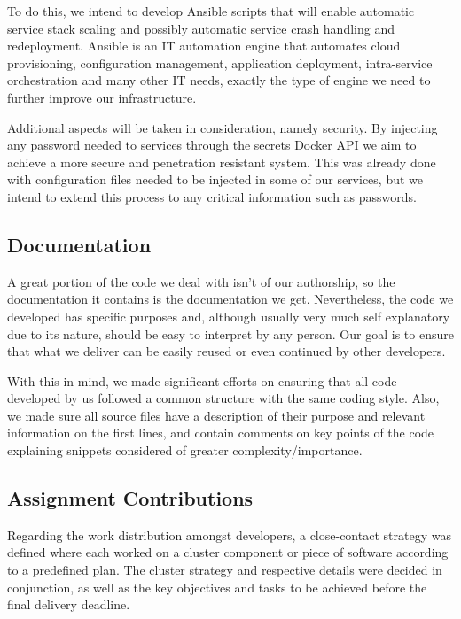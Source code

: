 \documentclass[12pt]{article}
\begin{document}
To do this, we intend to develop Ansible scripts that will enable automatic service stack scaling and possibly automatic service crash handling and redeployment.
Ansible \cite{ansible} is an IT automation engine that automates cloud provisioning, configuration management, application deployment, intra-service orchestration 
and many other IT needs, exactly the type of engine we need to further improve our infrastructure.

Additional aspects will be taken in consideration, namely security. 
By injecting any password needed to services through the secrets Docker API we aim to achieve a more secure and penetration resistant system. 
This was already done with configuration files needed to be injected in some of our services, but we intend to extend this process to any critical information 
such as passwords.

\subsection{Documentation} \label{remarks.documentation} %


A great portion of the code we deal with isn't of our authorship, so the documentation it contains is the documentation we get.
Nevertheless, the code we developed has specific purposes and, although usually very much self explanatory due to its nature, should be easy to interpret by any person.
Our goal is to ensure that what we deliver can be easily reused or even continued by other developers.

With this in mind, we made significant efforts on ensuring that all code developed by us followed a common structure with the same coding style.
Also, we made sure all source files have a description of their purpose and relevant information on the first lines, and contain comments on key points of the 
code explaining snippets considered of greater complexity/importance.

\subsection{Assignment Contributions} \label{remarks.contributions} %


Regarding the work distribution amongst developers, a close-contact strategy was defined where each worked on a cluster component or piece of software according 
to a predefined plan. 
The cluster strategy and respective details were decided in conjunction, as well as the key objectives and tasks to be achieved before the final delivery deadline.
\end{document}
